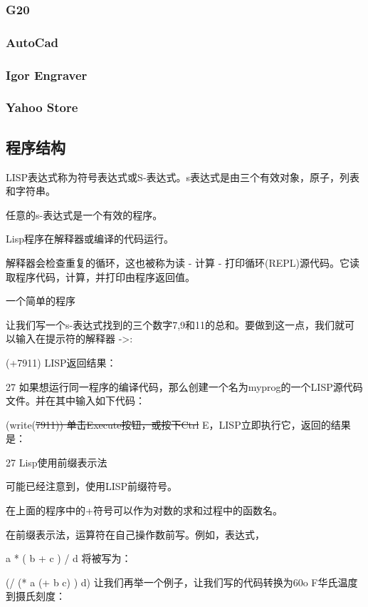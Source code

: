 \documentclass[11pt]{ctexart}
\begin{document}
{{{{\subsubsection{G20}
\label{sec:orgb8bcf16}

\subsubsection{AutoCad}
\label{sec:org0acdf4c}

\subsubsection{Igor Engraver}
\label{sec:orgd8e5250}

\subsubsection{Yahoo Store}
\label{sec:orgb7321de}

\subsection{程序结构}
\label{sec:org3bf93ac}
LISP表达式称为符号表达式或S-表达式。s表达式是由三个有效对象，原子，列表和字符串。

任意的s-表达式是一个有效的程序。

Lisp程序在解释器或编译的代码运行。

解释器会检查重复的循环，这也被称为读 - 计算 - 打印循环(REPL)源代码。它读取程序代码，计算，并打印由程序返回值。

一个简单的程序

让我们写一个s-表达式找到的三个数字7,9和11的总和。要做到这一点，我们就可以输入在提示符的解释器 ->:

(+7911)
LISP返回结果：

27
如果想运行同一程序的编译代码，那么创建一个名为myprog的一个LISP源代码文件。并在其中输入如下代码：

(write(\sout{7911))
单击Execute按钮，或按下Ctrl} E，LISP立即执行它，返回的结果是：

27
Lisp使用前缀表示法

可能已经注意到，使用LISP前缀符号。

在上面的程序中的+符号可以作为对数的求和过程中的函数名。

在前缀表示法，运算符在自己操作数前写。例如，表达式，

a * ( b + c ) / d
将被写为：

(/ (* a (+ b c) ) d)
让我们再举一个例子，让我们写的代码转换为60o F华氏温度到摄氏刻度：

}}}}
\end{document}
